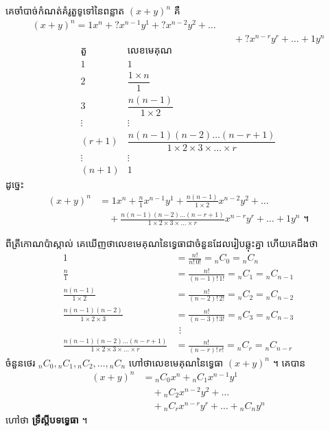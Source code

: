 គេចាំបាច់កំណត់គំរូតួទូទៅនៃពន្លាត $(x + y)^n$ គឺ
\[
\begin{aligned}
(x + y)^n = 1x^n + ?x^{n-1}y^1 + ?x^{n-2}y^2 + \ldots &\\
&\quad + ?x^{n-r}y^r + \ldots + 1y^n
\end{aligned}
\]
\[
\begin{array}{c|c}
\text{តួ} & \text{លេខមេគុណ}\\ \hline
1 & 1\\[4pt]
2 & \dfrac{1 \times n}{1}\\[8pt]
3 & \dfrac{n(n - 1)}{1 \times 2}\\[6pt]
\vdots & \vdots\\
(r + 1) & \dfrac{n(n - 1)(n - 2)\ldots(n - r + 1)}{1 \times 2 \times 3 \times \ldots \times r}\\[6pt]
\vdots & \vdots\\
(n + 1) & 1
\end{array}
\]
ដូច្នេះ
\[
\begin{aligned}
(x + y)^n &= 1x^n + \frac{n}{1}x^{n-1}y^1 + \frac{n(n - 1)}{1 \times 2}x^{n-2}y^2 + \ldots\\
&\quad + \frac{n(n - 1)(n - 2)\ldots(n - r + 1)}{1 \times 2 \times 3 \times \ldots \times r}x^{n-r}y^r + \ldots + 1y^n \text{ ។}
\end{aligned}
\]

ពីត្រីកោណប៉ាស្កាល់ គេឃើញថាលេខមេគុណនៃទ្វេធាជាចំនួនដែលរៀបឆ្លុះគ្នា ហើយគេដឹងថា
\[
\begin{aligned}
1 &= \frac{n!}{n!\,0!} = {}_nC_0 = {}_nC_n\\
\frac{n}{1} &= \frac{n!}{(n - 1)!\,1!} = {}_nC_1 = {}_nC_{n-1}\\
\frac{n(n - 1)}{1 \times 2} &= \frac{n!}{(n - 2)!\,2!} = {}_nC_2 = {}_nC_{n-2}\\
\frac{n(n - 1)(n - 2)}{1 \times 2 \times 3} &= \frac{n!}{(n - 3)!\,3!} = {}_nC_3 = {}_nC_{n-3}\\
&\ \,\vdots\\
\frac{n(n - 1)(n - 2)\ldots(n - r + 1)}{1 \times 2 \times 3 \times \ldots \times r} &= \frac{n!}{(n - r)!\,r!} = {}_nC_r = {}_nC_{n-r}
\end{aligned}
\]
ចំនួនថេរ ${}_nC_0, {}_nC_1, {}_nC_2, \ldots, {}_nC_n$ ហៅថាលេខមេគុណនៃទ្វេធា $(x + y)^n$ ។ គេបាន
\[
\begin{aligned}
(x + y)^n &= {}_nC_0x^n + {}_nC_1x^{n-1}y^1\\
&\quad + {}_nC_2x^{n-2}y^2 + \ldots\\
&\quad + {}_nC_rx^{n-r}y^r + \ldots + {}_nC_ny^n
\end{aligned}
\]
ហៅថា \textbf{ទ្រឹស្តីបទទ្វេធា} ។

